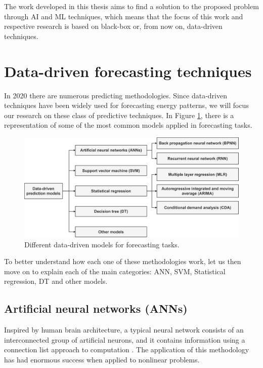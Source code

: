 The work developed in this thesis aims to find a solution to the proposed problem through \ac{AI} and \ac{ML} techniques, which means that the focus of this work and respective research is based on black-box or, from now on, data-driven techniques.

\section{Data-driven forecasting techniques\label{b}}

In 2020 there are numerous predicting methodologies. Since data-driven techniques have been widely used for forecasting energy patterns, we will focus our research on these class of predictive techniques. In Figure \ref{datamodels}, there is a representation of some of the most common models applied in forecasting tasks.

\begin{figure}[h!]
    \centering
    \begin{center}
    \includegraphics[width=1\textwidth]{Images/data-drive prediction models.png}
    \caption{Different data-driven models for forecasting tasks.}
    \label{datamodels}
    \end{center}
\end{figure}

To better understand how each one of these methodologies work, let us then move on to explain each of the main categories: \ac{ANN}, \ac{SVM}, Statistical regression, \ac{DT} and other models.


\subsection{Artificial neural networks (ANNs)}

Inspired by human brain architecture, a typical neural network consists of an interconnected group of artificial neurons, and it contains information using a connection list approach to computation \cite{ann1}. The application of this methodology has had enormous success when applied to nonlinear problems.

